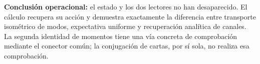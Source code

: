 \textbf{Conclusión operacional:} el estado y los dos lectores no han desaparecido. El cálculo recupera su acción y demuestra exactamente la diferencia entre transporte isométrico de modos, expectativa uniforme y recuperación analítica de canales. La segunda identidad de momentos tiene una vía concreta de comprobación mediante el conector común; la conjugación de cartas, por sí sola, no realiza esa comprobación.
